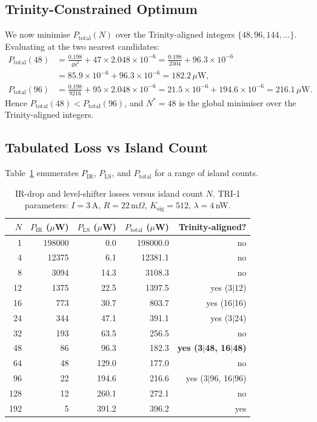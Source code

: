 \subsection{Trinity-Constrained Optimum}

We now minimise $P_{\mathrm{total}}(N)$ over the Trinity-aligned integers
$\{48, 96, 144, \ldots\}$.  Evaluating at the two nearest candidates:
\begin{align}
  P_{\mathrm{total}}(48)
  &= \frac{0.198}{48^2} + 47 \times 2.048 \times 10^{-6}
   = \frac{0.198}{2304} + 96.3 \times 10^{-6} \\
  &= 85.9 \times 10^{-6} + 96.3 \times 10^{-6}
   = 182.2 \,\mu\mathrm{W}, \\
  P_{\mathrm{total}}(96)
  &= \frac{0.198}{9216} + 95 \times 2.048 \times 10^{-6}
   = 21.5 \times 10^{-6} + 194.6 \times 10^{-6}
   = 216.1 \,\mu\mathrm{W}.
\end{align}
Hence $P_{\mathrm{total}}(48) < P_{\mathrm{total}}(96)$, and $N^* = 48$ is the
global minimiser over the Trinity-aligned integers.

\subsection{Tabulated Loss vs Island Count}

Table~\ref{tab:loss_vs_n} enumerates $P_{\mathrm{IR}}$, $P_{\mathrm{LS}}$, and
$P_{\mathrm{total}}$ for a range of island counts.

\begin{table}[ht]
\centering
\caption{IR-drop and level-shifter losses versus island count $N$.
TRI-1 parameters: $I=3$\,A, $R=22$\,m$\Omega$, $K_{\mathrm{sig}}=512$,
$\lambda=4$\,nW.}
\label{tab:loss_vs_n}
\begin{tabular}{rrrrr}
\hline
$N$ & $P_{\mathrm{IR}}$ ($\mu$W) & $P_{\mathrm{LS}}$ ($\mu$W) &
      $P_{\mathrm{total}}$ ($\mu$W) & Trinity-aligned? \\
\hline
  1  & 198000 &     0.0 & 198000.0 & no  \\
  4  &  12375 &     6.1 &  12381.1 & no  \\
  8  &   3094 &    14.3 &   3108.3 & no  \\
 12  &   1375 &    22.5 &   1397.5 & yes (3$|$12) \\
 16  &    773 &    30.7 &    803.7 & yes (16$|$16) \\
 24  &    344 &    47.1 &    391.1 & yes (3$|$24) \\
 32  &    193 &    63.5 &    256.5 & no  \\
 48  &     86 &    96.3 &    182.3 & \textbf{yes (3$|$48, 16$|$48)} \\
 64  &     48 &   129.0 &    177.0 & no  \\
 96  &     22 &   194.6 &    216.6 & yes (3$|$96, 16$|$96) \\
128  &     12 &   260.1 &    272.1 & no  \\
192  &      5 &   391.2 &    396.2 & yes \\
\hline
\end{tabular}
\end{table}

